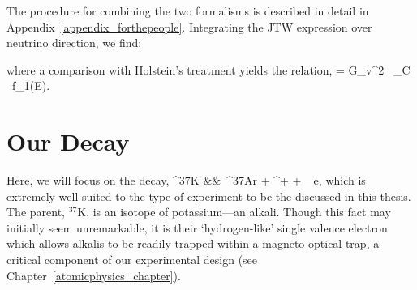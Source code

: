 	
	The procedure for combining the two formalisms is described in detail in Appendix~\ref{appendix_forthepeople}.  
Integrating the JTW expression over neutrino direction, we find:

where a comparison with Holstein's treatment yields the relation,
\bea
\xi = G_v^2 \, \cos\theta_C \, f_1(E).
\eea



\section{Our Decay}

Here, we will focus on the decay,
\bea
^{37}\textrm{K} &\rightarrow& \,^{37}\textrm{\!Ar} + \beta^{+} + \nu_e, 
\label{eq:ourdecay}
\eea
which is extremely well suited to the type of experiment to be the discussed in this thesis.  
The parent, $^{37}\textrm{K}$, is an isotope of potassium---an alkali.  Though this fact may initially seem unremarkable, it is their `hydrogen-like' single valence electron which allows alkalis to be readily trapped within a magneto-optical trap, a critical component of our experimental design (see Chapter~\ref{atomicphysics_chapter}).

